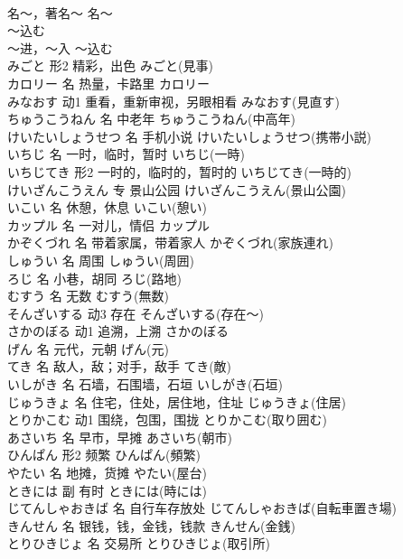 \documentclass[8pt]{extreport}
\begin{document}
\begin{CJK}{UTF8}{min}
\\	名～，著名～	名～	
\\	～込む	
\\	～进，～入	～込む	
\\	みごと	形2	精彩，出色	みごと(見事)	
\\	カロリー	名	热量，卡路里	カロリー	
\\	みなおす	动1	重看，重新审视，另眼相看	みなおす(見直す)	
\\	ちゅうこうねん	名	中老年	ちゅうこうねん(中高年)	
\\	けいたいしょうせつ	名	手机小说	けいたいしょうせつ(携帯小説)	
\\	いちじ	名	一时，临时，暂时	いちじ(一時)	
\\	いちじてき	形2	一时的，临时的，暂时的	いちじてき(一時的)	
\\	けいざんこうえん	专	景山公园	けいざんこうえん(景山公園)	
\\	いこい	名	休憩，休息	いこい(憩い)	
\\	カップル	名	一对儿，情侣	カップル	
\\	かぞくづれ	名	带着家属，带着家人	かぞくづれ(家族連れ)	
\\	しゅうい	名	周围	しゅうい(周囲)	
\\	ろじ	名	小巷，胡同	ろじ(路地)	
\\	むすう	名	无数	むすう(無数)	
\\	そんざいする	动3	存在	そんざいする(存在～)	
\\	さかのぼる	动1	追溯，上溯	さかのぼる	
\\	げん	名	元代，元朝	げん(元)	
\\	てき	名	敌人，敌；对手，敌手	てき(敵)	
\\	いしがき	名	石墙，石围墙，石垣	いしがき(石垣)	
\\	じゅうきょ	名	住宅，住处，居住地，住址	じゅうきょ(住居)	
\\	とりかこむ	动1	围绕，包围，围拢	とりかこむ(取り囲む)	
\\	あさいち	名	早市，早摊	あさいち(朝市)	
\\	ひんぱん	形2	频繁	ひんぱん(頻繁)	
\\	やたい	名	地摊，货摊	やたい(屋台)	
\\	ときには	副	有时	ときには(時には)	
\\	じてんしゃおきば	名	自行车存放处	じてんしゃおきば(自転車置き場)	
\\	きんせん	名	银钱，钱，金钱，钱款	きんせん(金銭)	
\\	とりひきじょ	名	交易所	とりひきじょ(取引所)	

\end{CJK}
\end{document}
